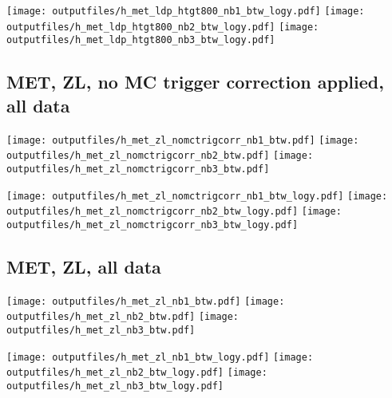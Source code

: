 \documentclass[11pt]{article}
\begin{document}
    \noindent
     \texttt{[image: outputfiles/h\_met\_ldp\_htgt800\_nb1\_btw\_logy.pdf]}
     \texttt{[image: outputfiles/h\_met\_ldp\_htgt800\_nb2\_btw\_logy.pdf]}
     \texttt{[image: outputfiles/h\_met\_ldp\_htgt800\_nb3\_btw\_logy.pdf]}



     \subsection{ MET, ZL, no MC trigger correction applied, all data}

    \noindent
     \texttt{[image: outputfiles/h\_met\_zl\_nomctrigcorr\_nb1\_btw.pdf]}
     \texttt{[image: outputfiles/h\_met\_zl\_nomctrigcorr\_nb2\_btw.pdf]}
     \texttt{[image: outputfiles/h\_met\_zl\_nomctrigcorr\_nb3\_btw.pdf]}

    \noindent
     \texttt{[image: outputfiles/h\_met\_zl\_nomctrigcorr\_nb1\_btw\_logy.pdf]}
     \texttt{[image: outputfiles/h\_met\_zl\_nomctrigcorr\_nb2\_btw\_logy.pdf]}
     \texttt{[image: outputfiles/h\_met\_zl\_nomctrigcorr\_nb3\_btw\_logy.pdf]}


     \subsection{ MET, ZL, all data}

    \noindent
     \texttt{[image: outputfiles/h\_met\_zl\_nb1\_btw.pdf]}
     \texttt{[image: outputfiles/h\_met\_zl\_nb2\_btw.pdf]}
     \texttt{[image: outputfiles/h\_met\_zl\_nb3\_btw.pdf]}

    \noindent
     \texttt{[image: outputfiles/h\_met\_zl\_nb1\_btw\_logy.pdf]}
     \texttt{[image: outputfiles/h\_met\_zl\_nb2\_btw\_logy.pdf]}
     \texttt{[image: outputfiles/h\_met\_zl\_nb3\_btw\_logy.pdf]}




\end{document}
